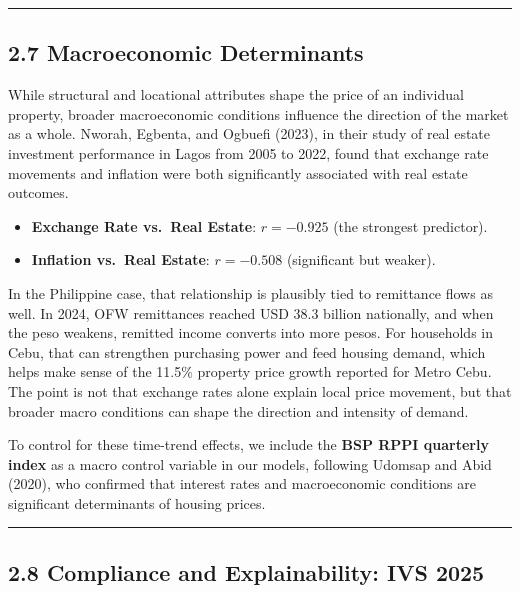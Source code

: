 \begin{center}\rule{0.5\linewidth}{0.5pt}\end{center}

\subsection{\texorpdfstring{\textbf{2.7 Macroeconomic Determinants}}{2.7 Macroeconomic Determinants}}\label{macroeconomic-determinants}

While structural and locational attributes shape the price of an individual property, broader macroeconomic conditions influence the direction of the market as a whole. Nworah, Egbenta, and Ogbuefi (2023), in their study of real estate investment performance in Lagos from 2005 to 2022, found that exchange rate movements and inflation were both significantly associated with real estate outcomes.

\begin{itemize}
\item \textbf{Exchange Rate vs.~Real Estate}: $r = -0.925$ (the strongest predictor).
\item \textbf{Inflation vs.~Real Estate}: $r = -0.508$ (significant but weaker).
\end{itemize}

In the Philippine case, that relationship is plausibly tied to remittance flows as well. In 2024, OFW remittances reached USD 38.3 billion nationally, and when the peso weakens, remitted income converts into more pesos. For households in Cebu, that can strengthen purchasing power and feed housing demand, which helps make sense of the 11.5\% property price growth reported for Metro Cebu. The point is not that exchange rates alone explain local price movement, but that broader macro conditions can shape the direction and intensity of demand.

To control for these time-trend effects, we include the \textbf{BSP RPPI quarterly index} as a macro control variable in our models, following Udomsap and Abid (2020), who confirmed that interest rates and macroeconomic conditions are significant determinants of housing prices.

\begin{center}\rule{0.5\linewidth}{0.5pt}\end{center}

\subsection{\texorpdfstring{\textbf{2.8 Compliance and Explainability: IVS 2025}}{2.8 Compliance and Explainability: IVS 2025}}\label{compliance-and-explainability-ivs-2025}

